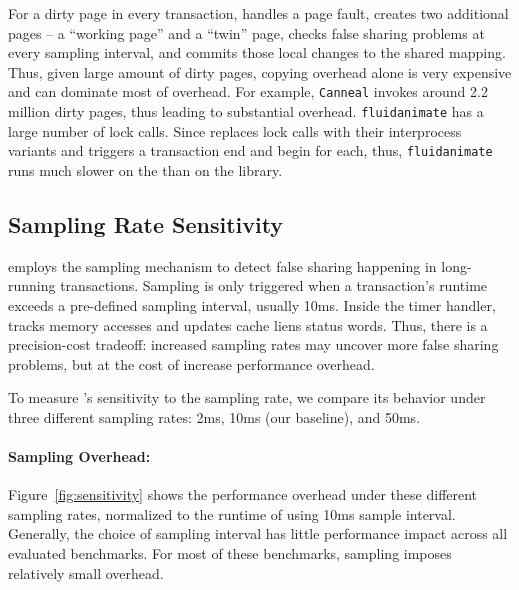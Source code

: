 For a dirty page in every transaction, \sheriffdetect{} handles a page fault, creates two additional pages -- a ``working page'' and a ``twin'' page, checks false sharing problems at every sampling interval, and commits those local changes to the shared mapping. Thus, given large amount of dirty pages, copying overhead alone is very expensive and can dominate most of overhead. For example, \texttt{Canneal} invokes around 2.2 million dirty pages, thus leading to substantial overhead. \texttt{fluidanimate} has a large number of lock calls. Since \SheriffDetect{} replaces lock calls with their interprocess variants and triggers a transaction end and begin for each, thus, \texttt{fluidanimate} runs much slower on the \SheriffDetect{} than on the \pthreads{} library.
 
\subsection{\SheriffDetect{} Sampling Rate Sensitivity}
\label{sec:results-sampling-overhead}

\SheriffDetect{} employs the sampling mechanism to detect false sharing happening in long-running transactions. Sampling is only triggered when a transaction's runtime exceeds a pre-defined sampling interval, usually 10ms. Inside the timer handler, \SheriffDetect{} tracks memory accesses and updates cache liens status words. Thus, there is a precision-cost tradeoff: increased sampling rates may uncover more false sharing problems, but at the cost of increase performance overhead. 

To measure \sheriffdetect{}'s sensitivity to the sampling rate, we compare its behavior under three different sampling rates: 2ms, 10ms (our baseline), and 50ms.

\paragraph{Sampling Overhead:} Figure~\ref{fig:sensitivity} shows the performance overhead under these different sampling rates, normalized to the runtime of using 10ms sample interval. Generally, the choice of sampling interval has little performance impact across all evaluated benchmarks. For most of these benchmarks, sampling imposes relatively
small overhead.


